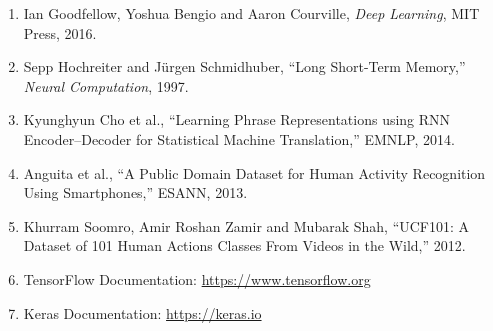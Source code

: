 \documentclass[10pt]{article}
\begin{document}
\begin{enumerate}
\item Ian Goodfellow, Yoshua Bengio and Aaron Courville,
\emph{Deep Learning}, MIT Press, 2016.

\item Sepp Hochreiter and Jürgen Schmidhuber,
``Long Short-Term Memory,'' \emph{Neural Computation}, 1997.

\item Kyunghyun Cho et al.,
``Learning Phrase Representations using RNN Encoder--Decoder for Statistical
Machine Translation,'' EMNLP, 2014.

\item Anguita et al.,
``A Public Domain Dataset for Human Activity Recognition Using Smartphones,''
ESANN, 2013.

\item Khurram Soomro, Amir Roshan Zamir and Mubarak Shah,
``UCF101: A Dataset of 101 Human Actions Classes From Videos in the Wild,''
2012.

\item TensorFlow Documentation:
\url{https://www.tensorflow.org}

\item Keras Documentation:
\url{https://keras.io}
\end{enumerate}
\end{document}
